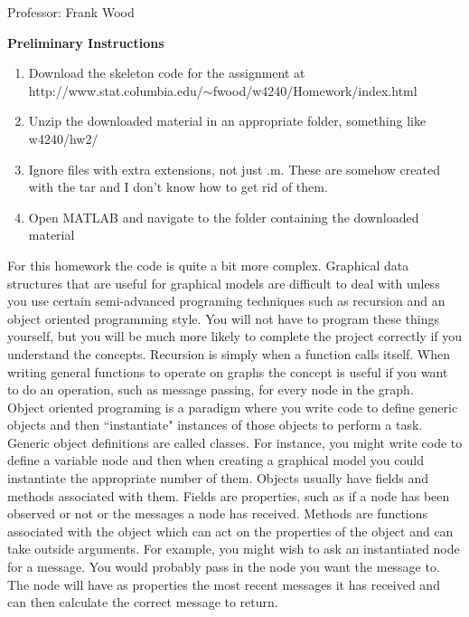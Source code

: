 \documentclass[12pt]{article}
\begin{document}

\begin{center}
	Professor: Frank Wood
\end{center}


{\bf Preliminary Instructions}

\begin{enumerate}
	\item Download the skeleton code for the assignment at \\  http://www.stat.columbia.edu/$\sim$fwood/w4240/Homework/index.html
	\item Unzip the downloaded material in an appropriate folder, something like w4240/hw2/
	\item Ignore files with extra extensions, not just .m.  These are somehow created with the tar and I don't know how to get rid of them.
	\item Open MATLAB and navigate to the folder containing the downloaded material
\end{enumerate}

For this homework the code is quite a bit more complex.  Graphical data structures that are useful for graphical models are difficult to deal with unless you use certain semi-advanced programing techniques such as recursion and an object oriented programming style. You will not have to program these things yourself, but you will be much more likely to complete the project correctly if you understand the concepts.  Recursion is simply when a function calls itself.  When writing general functions to operate on graphs the concept is useful if you want to do an operation, such as message passing, for every node in the graph.  \\

Object oriented programing is a paradigm where you write code to define generic objects and then ``instantiate" instances of those objects to perform a task.  Generic object definitions are called classes.  For instance, you might write code to define a variable node and then when creating a graphical model you could instantiate the appropriate number of them.  Objects usually have fields and methods associated with them.  Fields are properties, such as if a node has been observed or not or the messages a node has received.  Methods are functions associated with the object which can act on the properties of the object and can take outside arguments.  For example, you might wish to ask an instantiated node for a message.  You would probably pass in the node you want the message to.  The node will have as properties the most recent messages it has received and can then calculate the correct message to return. \\
\end{document}
